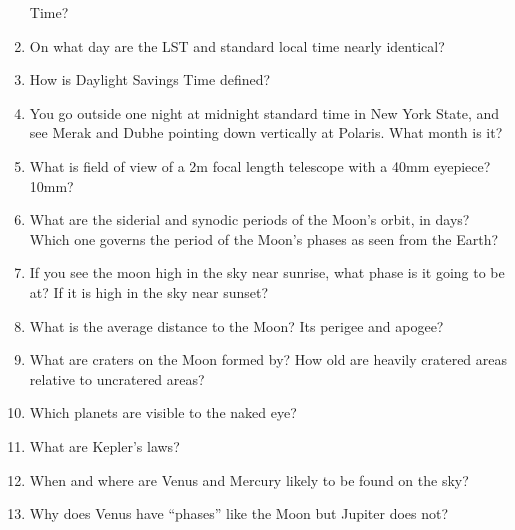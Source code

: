 \documentclass[12pt]{article}
\begin{document}
\begin{enumerate}
  Time?
\item On what day are the LST and standard local time nearly
  identical?
\item How is Daylight Savings Time defined?
\item You go outside one night at midnight standard time in New York
  State, and see Merak and Dubhe pointing down vertically at
  Polaris. What month is it? 
\item What is field of view of a 2m focal length telescope with a 40mm
  eyepiece? 10mm?
\item What are the siderial and synodic periods of the Moon's orbit, in days?
  Which one governs the period of the Moon's phases as seen from
  the Earth?
\item If you see the moon high in the sky near sunrise, what phase is
  it going to be at? If it is high in the sky near sunset?
\item What is the average distance to the Moon? Its perigee and apogee?
\item What are craters on the Moon formed by? How old are heavily
  cratered areas relative to uncratered areas?
\item Which planets are visible to the naked eye?
\item What are Kepler's laws?
\item When and where are Venus and Mercury likely to be found on the
  sky?
\item Why does Venus have ``phases'' like the Moon but Jupiter does
  not?
\end{enumerate}
\end{document}
